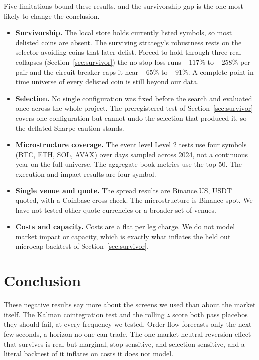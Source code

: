 \documentclass[11pt]{article}
\begin{document}
Five limitations bound these results, and the survivorship gap is the one most likely to change
the conclusion.

\begin{itemize}
\item \textbf{Survivorship.} The local store holds currently listed symbols, so most delisted
coins are absent. The surviving strategy's robustness rests on the selector avoiding coins that
later delist. Forced to hold through three real collapses (Section~\ref{sec:survivor}) the no stop
loss runs $-117\%$ to $-258\%$ per pair and the circuit breaker caps it near $-65\%$ to $-91\%$. A
complete point in time universe of every delisted coin is still beyond our data.
\item \textbf{Selection.} No single configuration was fixed before the search and evaluated once
across the whole project. The preregistered test of Section~\ref{sec:survivor} covers one
configuration but cannot undo the selection that produced it, so the deflated Sharpe caution
stands.
\item \textbf{Microstructure coverage.} The event level Level 2 tests use four symbols (BTC, ETH,
SOL, AVAX) over days sampled across 2024, not a continuous year on the full universe. The
aggregate book metrics use the top 50. The execution and impact results are four symbol.
\item \textbf{Single venue and quote.} The spread results are Binance.US, USDT quoted, with a
Coinbase cross check. The microstructure is Binance spot. We have not tested other quote
currencies or a broader set of venues.
\item \textbf{Costs and capacity.} Costs are a flat per leg charge. We do not model market impact
or capacity, which is exactly what inflates the held out microcap backtest of
Section~\ref{sec:survivor}.
\end{itemize}

\section{Conclusion}
\label{sec:conclusion}

These negative results say more about the screens we used than about the market itself. The Kalman cointegration test and the rolling
$z$ score both pass placebos they should fail, at every frequency we tested. Order flow forecasts
only the next few seconds, a horizon no one can trade. The one market neutral reversion effect
that survives is real but marginal, stop sensitive, and selection sensitive, and a literal
backtest of it inflates on costs it does not model.
\end{document}
